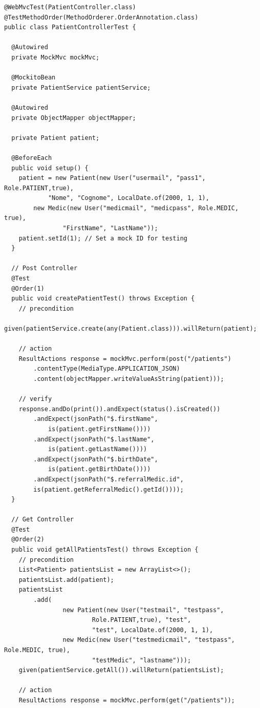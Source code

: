 \documentclass[a4paper]{article}
\begin{document}
\begin{verbatim}
@WebMvcTest(PatientController.class)
@TestMethodOrder(MethodOrderer.OrderAnnotation.class)
public class PatientControllerTest {

  @Autowired
  private MockMvc mockMvc;

  @MockitoBean
  private PatientService patientService;

  @Autowired
  private ObjectMapper objectMapper;

  private Patient patient;

  @BeforeEach
  public void setup() {
    patient = new Patient(new User("usermail", "pass1", Role.PATIENT,true),
            "Nome", "Cognome", LocalDate.of(2000, 1, 1),
        new Medic(new User("medicmail", "medicpass", Role.MEDIC, true),
                "FirstName", "LastName"));
    patient.setId(1); // Set a mock ID for testing
  }

  // Post Controller
  @Test
  @Order(1)
  public void createPatientTest() throws Exception {
    // precondition
    given(patientService.create(any(Patient.class))).willReturn(patient);

    // action
    ResultActions response = mockMvc.perform(post("/patients")
        .contentType(MediaType.APPLICATION_JSON)
        .content(objectMapper.writeValueAsString(patient)));

    // verify
    response.andDo(print()).andExpect(status().isCreated())
        .andExpect(jsonPath("$.firstName",
            is(patient.getFirstName())))
        .andExpect(jsonPath("$.lastName",
            is(patient.getLastName())))
        .andExpect(jsonPath("$.birthDate",
            is(patient.getBirthDate())))
        .andExpect(jsonPath("$.referralMedic.id", 
        is(patient.getReferralMedic().getId())));
  }

  // Get Controller
  @Test
  @Order(2)
  public void getAllPatientsTest() throws Exception {
    // precondition
    List<Patient> patientsList = new ArrayList<>();
    patientsList.add(patient);
    patientsList
        .add(
                new Patient(new User("testmail", "testpass", 
                        Role.PATIENT,true), "test",
                        "test", LocalDate.of(2000, 1, 1),
                new Medic(new User("testmedicmail", "testpass", Role.MEDIC, true),
                        "testMedic", "lastname")));
    given(patientService.getAll()).willReturn(patientsList);

    // action
    ResultActions response = mockMvc.perform(get("/patients"));


\end{verbatim}
\end{document}
